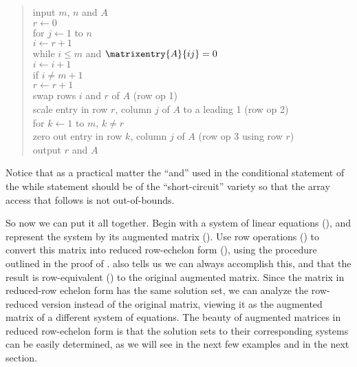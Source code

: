 %
%
\begin{quote}
  input $m$, $n$ and $A$\\
  $r\leftarrow 0$\\
  for $j\leftarrow 1$ to $n$\\
     $i\leftarrow r+1$\\
     while $i\leq m$ and $\matrixentry{A}{ij}=0$\\
         $i \leftarrow i+1$\\
     if $i\neq m+1$\\
         $r\leftarrow r+1$\\
         swap rows $i$ and $r$ of $A$ (row op 1)\\
         scale entry in row $r$, column $j$ of $A$ to a leading 1 (row op 2)\\
         for $k\leftarrow 1\text{ to }m$, $k\neq r$\\
            zero out entry in row $k$, column $j$ of $A$ (row op 3 using row $r$)\\
  output $r$ and $A$
\end{quote}
%
Notice that as a practical matter the ``and'' used in the conditional statement of the while statement should be of the ``short-circuit'' variety so that the array access that follows is not out-of-bounds.\par
%
So now we can put it all together.  Begin with a system of linear equations (), and represent the system by its augmented matrix ().  Use row operations () to convert this matrix into reduced row-echelon form (), using the procedure outlined in the proof of .   also tells us we can always accomplish this, and that the result is row-equivalent () to the original augmented matrix.  Since the matrix in reduced-row echelon form has the same solution set, we can analyze the row-reduced version instead of the original matrix, viewing it as the augmented matrix of a different system of equations.  The beauty of augmented matrices in reduced row-echelon form is that the solution sets to their corresponding systems can be easily determined, as we will see in the next few examples and in the next section.\par
